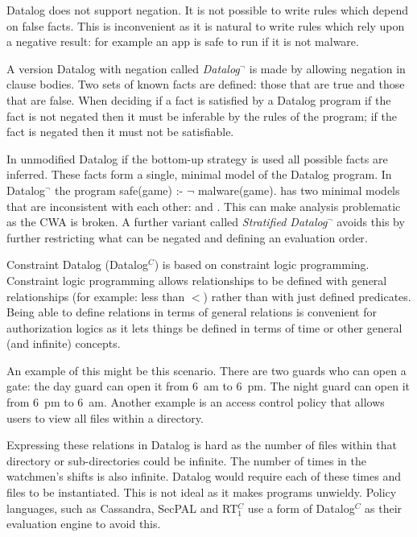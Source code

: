 \documentclass[a4paper,sfsidenotes]{tufte-book}
\begin{document}
Datalog does not support negation. It is not possible to write
rules which depend on false facts.  This is inconvenient as it is
natural to write rules which rely upon a negative result: for example
an app is safe to run if it is not malware.

A version Datalog with negation called \emph{Datalog$^\lnot$}\cite{Ceri:1989ff} is
made by allowing negation in clause bodies. Two sets of known
facts are defined: those that are true and those that are false.
When deciding if a fact is satisfied by a Datalog program if the fact is not
negated then it must be inferable by the rules of the program; if the fact is
negated then it must not be satisfiable.  

In unmodified Datalog if the bottom-up strategy
is used all possible facts are inferred. These facts form a single, minimal
model of the Datalog program.  In Datalog$^\lnot$ the program \textsf{safe(game)
:- $\mathsf\lnot$ malware(game).} has two minimal models that are inconsistent
with each other:  and .  This can make
analysis problematic as the \ac{CWA} is broken. A further variant called
\emph{Stratified Datalog$^\lnot$} avoids this by further restricting what can be
negated and defining an evaluation order\cite{Apt:1986vj}.

Constraint Datalog (Datalog$^C$\cite{Li:2003ix}) is based
on constraint logic programming.  Constraint logic programming allows
relationships to be defined with general relationships (for example:
less than $<$) rather than with just defined predicates.  Being able to
define relations in terms of general relations is convenient for
authorization logics as it lets things be defined in terms of time or
other general (and infinite) concepts. 

An example of this might be this scenario. There are two guards who
can open a gate: the day guard can open it from 6~am to 6~pm. The night guard
can open it from 6~pm to 6~am. Another example is an access control policy that
allows users to view all files within a directory.

Expressing these relations in Datalog is hard as the number of
files within that directory or sub-directories could be infinite. The number of
times in the watchmen's shifts is also infinite.
Datalog would require each of these times and files to be instantiated. This is
not ideal as it makes programs unwieldy. Policy languages, such as
Cassandra\cite{Becker:2004fi}, SecPAL\cite{Becker:2006vh} and
RT$_1^C$\cite{Li:2003ix} use a form of Datalog$^C$ as their evaluation engine to
avoid this.
\end{document}
